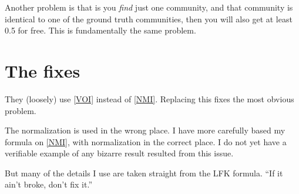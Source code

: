 \documentclass[9pt,technote]{IEEEtran}
\begin{document}
Another problem is that is you \emph{find} just one community, and that community is identical to one of the
ground truth communities, then you will also get at least 0.5 for free. This is fundamentally the same problem.

\section{The fixes}
They (loosely) use \cref{VOI} instead of \cref{NMI}. Replacing this fixes the most obvious problem.

The normalization is used in the wrong place.
I have more carefully based my formula on \cref{NMI}, with normalization in the correct place.
I do not yet have a verifiable example of any bizarre result resulted from this issue.

But many of the details I use are taken straight from the LFK formula. ``If it ain't broke, don't fix it.''
\end{document}
